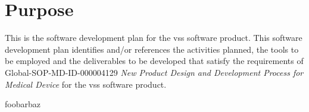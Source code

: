\section{Purpose}
This is the software development plan for the \gls{vss} software product. This
software development plan identifies and/or references the activities planned,
the tools to be employed and the deliverables to be developed that satisfy the
requirements of Global-SOP-MD-ID-000004129 \textit{New Product Design and
Development Process for Medical Device} for the \gls{vss} software product.

\tlcVspace

\gls{foobarbaz}

